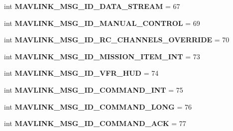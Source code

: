 \begin{DoxyCompactItemize}
\item 
\mbox{\label{namespacepymavlink_1_1dialects_1_1v10_a0d759e4319999434119b195976d53126}} 
int {\bfseries M\+A\+V\+L\+I\+N\+K\+\_\+\+M\+S\+G\+\_\+\+I\+D\+\_\+\+D\+A\+T\+A\+\_\+\+S\+T\+R\+E\+AM} = 67
\item 
\mbox{\label{namespacepymavlink_1_1dialects_1_1v10_a2c6825002a446760e3f7934470a3d407}} 
int {\bfseries M\+A\+V\+L\+I\+N\+K\+\_\+\+M\+S\+G\+\_\+\+I\+D\+\_\+\+M\+A\+N\+U\+A\+L\+\_\+\+C\+O\+N\+T\+R\+OL} = 69
\item 
\mbox{\label{namespacepymavlink_1_1dialects_1_1v10_a96bc20dc3664e9d6c8feaa30f0724a91}} 
int {\bfseries M\+A\+V\+L\+I\+N\+K\+\_\+\+M\+S\+G\+\_\+\+I\+D\+\_\+\+R\+C\+\_\+\+C\+H\+A\+N\+N\+E\+L\+S\+\_\+\+O\+V\+E\+R\+R\+I\+DE} = 70
\item 
\mbox{\label{namespacepymavlink_1_1dialects_1_1v10_a55f635461ebf8f1de840fb6ab125bb4a}} 
int {\bfseries M\+A\+V\+L\+I\+N\+K\+\_\+\+M\+S\+G\+\_\+\+I\+D\+\_\+\+M\+I\+S\+S\+I\+O\+N\+\_\+\+I\+T\+E\+M\+\_\+\+I\+NT} = 73
\item 
\mbox{\label{namespacepymavlink_1_1dialects_1_1v10_a60aa86512fcf970dbfeab018792353a9}} 
int {\bfseries M\+A\+V\+L\+I\+N\+K\+\_\+\+M\+S\+G\+\_\+\+I\+D\+\_\+\+V\+F\+R\+\_\+\+H\+UD} = 74
\item 
\mbox{\label{namespacepymavlink_1_1dialects_1_1v10_a719f07b5565969d3504dc8b94032ef59}} 
int {\bfseries M\+A\+V\+L\+I\+N\+K\+\_\+\+M\+S\+G\+\_\+\+I\+D\+\_\+\+C\+O\+M\+M\+A\+N\+D\+\_\+\+I\+NT} = 75
\item 
\mbox{\label{namespacepymavlink_1_1dialects_1_1v10_ad03226ddea9c29c84ccfce64090dfb32}} 
int {\bfseries M\+A\+V\+L\+I\+N\+K\+\_\+\+M\+S\+G\+\_\+\+I\+D\+\_\+\+C\+O\+M\+M\+A\+N\+D\+\_\+\+L\+O\+NG} = 76
\item 
\mbox{\label{namespacepymavlink_1_1dialects_1_1v10_a8ff6844368a23834341fd3b91d812c07}} 
int {\bfseries M\+A\+V\+L\+I\+N\+K\+\_\+\+M\+S\+G\+\_\+\+I\+D\+\_\+\+C\+O\+M\+M\+A\+N\+D\+\_\+\+A\+CK} = 77

\end{DoxyCompactItemize}

